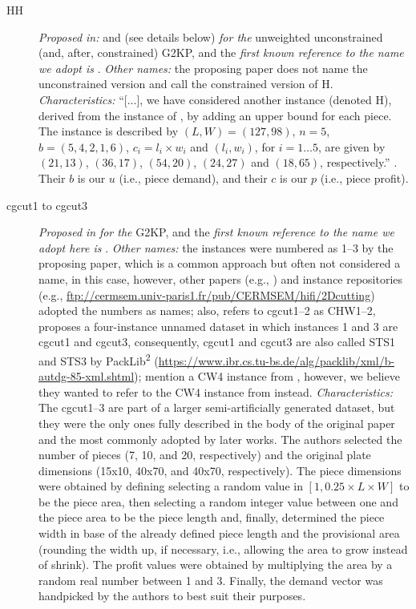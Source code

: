 \documentclass[ppgc,tese,english,formais,babel]{iiufrgs}
\begin{document}
\begin{description}
\item [HH] \emph{Proposed in:} \citet{herz:1972} and \citet{hifi:1997} (see details below) \emph{for the} unweighted unconstrained (and, after, constrained) G2KP, and the \emph{first known reference to the name we adopt is} \citet{cung:2000}. \emph{Other names:} the proposing paper does not name the unconstrained version and \citet{hifi:1997} call the constrained version of H. \emph{Characteristics: } ``[...], we have considered another instance (denoted H), derived from the instance of \citet{herz:1972}, by adding an upper bound for each piece. The instance is described by \((L, W) = (127, 98)\), \(n = 5\), \(b = (5, 4, 2, 1, 6)\), \(c_i = l_i \times w_i\) and \((l_i, w_i)\), for \(i = 1 \dots 5\), are given by \((21, 13)\), \((36, 17)\), \((54, 20)\), \((24, 27)\) and \((18, 65)\), respectively.'' \citep{hifi:1997}. Their \(b\) is our \(u\) (i.e., piece demand), and their \(c\) is our \(p\) (i.e., piece profit).
\item [cgcut1 to cgcut3] \emph{Proposed in} \citet{cw:1977} \emph{for the} G2KP, and the \emph{first known reference to the name we adopt here is} \citet{martello:1998}. \emph{Other names:} the instances were numbered as 1--3 by the proposing paper, which is a common approach but often not considered a name, in this case, however, other papers (e.g., \citet{hifi:1997}) and instance repositories (e.g., \url{ftp://cermsem.univ-paris1.fr/pub/CERMSEM/hifi/2Dcutting}) adopted the numbers as names; also, \citet{fayard:1998} refers to cgcut1--2 as CHW1--2, \citet{tschoke:1995} proposes a four-instance unnamed dataset in which instances 1 and 3 are cgcut1 and cgcut3, consequently, cgcut1 and cgcut3 are also called STS1 and STS3 by PackLib\textsuperscript{2} (\url{https://www.ibr.cs.tu-bs.de/alg/packlib/xml/b-autdg-85-xml.shtml}); \citet{velasco:2019} mention a CW4 instance from \citet{cw:1977}, however, we believe they wanted to refer to the CW4 instance from \citet{fayard:1998} instead. \emph{Characteristics:} The cgcut1--3 are part of a larger semi-artificially generated dataset, but they were the only ones fully described in the body of the original paper and the most commonly adopted by later works. The authors selected the number of pieces (7, 10, and 20, respectively) and the original plate dimensions (15x10, 40x70, and 40x70, respectively). The piece dimensions were obtained by defining selecting a random value in \([1, 0.25\times L \times W]\) to be the piece area, then selecting a random integer value between one and the piece area to be the piece length and, finally, determined the piece width in base of the already defined piece length and the provisional area (rounding the width up, if necessary, i.e., allowing the area to grow instead of shrink). The profit values were obtained by multiplying the area by a random real number between 1 and 3. Finally, the demand vector was handpicked by the authors to best suit their purposes.

\end{description}
\end{document}
